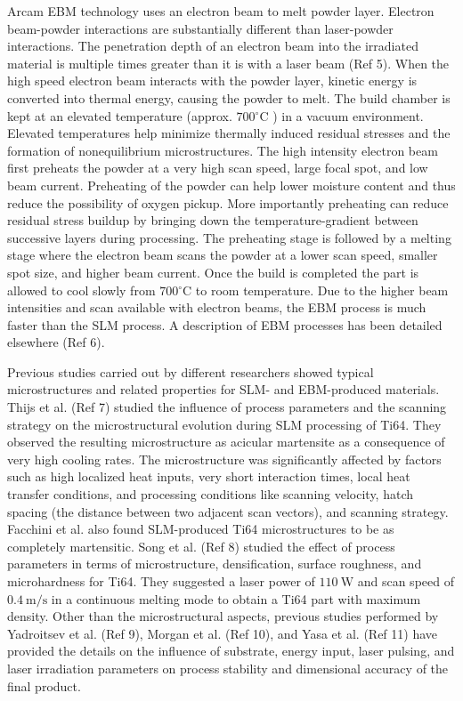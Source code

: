 \documentclass[10pt]{article}
\begin{document}
Arcam EBM technology uses an electron beam to melt powder layer. Electron beam-powder interactions are substantially different than laser-powder interactions. The penetration depth of an electron beam into the irradiated material is multiple times greater than it is with a laser beam (Ref 5). When the high speed electron beam interacts with the powder layer, kinetic energy is converted into thermal energy, causing the powder to melt. The build chamber is kept at an elevated temperature (approx. $700{ }^{\circ} \mathrm{C}$ ) in a vacuum environment. Elevated temperatures help minimize thermally induced residual stresses and the formation of nonequilibrium microstructures. The high intensity electron beam first preheats the powder at a very high scan speed, large focal spot, and low beam current. Preheating of the powder can help lower moisture content and thus reduce the possibility of oxygen pickup. More importantly preheating can reduce residual stress buildup by bringing down the temperature-gradient between successive layers during processing. The preheating stage is followed by a melting stage where the electron beam scans the powder at a lower scan speed, smaller spot size, and higher beam current. Once the build is completed the part is allowed to cool slowly from $700{ }^{\circ} \mathrm{C}$ to room temperature. Due to the higher beam intensities and scan available with electron beams, the EBM process is much faster than the SLM process. A description of EBM processes has been detailed elsewhere (Ref 6).

Previous studies carried out by different researchers showed typical microstructures and related properties for SLM- and EBM-produced materials. Thijs et al. (Ref 7) studied the influence of process parameters and the scanning strategy on the microstructural evolution during SLM processing of Ti64. They observed the resulting microstructure as acicular martensite as a consequence of very high cooling rates. The microstructure was significantly affected by factors such as high localized heat inputs, very short interaction times, local heat transfer conditions, and processing conditions like scanning velocity, hatch spacing (the distance between two adjacent scan vectors), and scanning strategy. Facchini et al. also found SLM-produced Ti64 microstructures to be as completely martensitic. Song et al. (Ref 8) studied the effect of process parameters in terms of microstructure, densification, surface roughness, and microhardness for Ti64. They suggested a laser power of $110 \mathrm{~W}$ and scan speed of $0.4 \mathrm{~m} / \mathrm{s}$ in a continuous melting mode to obtain a Ti64 part with maximum density. Other than the microstructural aspects, previous studies performed by Yadroitsev et al. (Ref 9), Morgan et al. (Ref 10), and Yasa et al. (Ref 11) have provided the details on the influence of substrate, energy input, laser pulsing, and laser irradiation parameters on process stability and dimensional accuracy of the final product.
\end{document}
